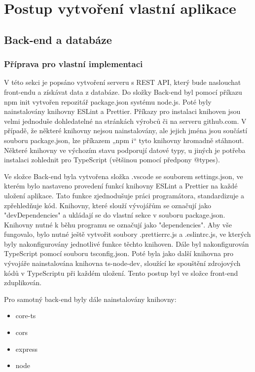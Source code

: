 \chapter{Postup vytvoření vlastní aplikace}

\section{Back-end a databáze}
\subsection{Příprava pro vlastní implementaci}
V této sekci je popsáno vytvoření serveru s REST API, který bude naslouchat front-endu a získávat data z databáze. Do složky Back-end byl pomocí příkazu npm init vytvořen repozitář package.json systému node.js. Poté byly nainstalovány knihovny ESLint a Prettier. Příkazy pro instalaci knihoven jsou velmi jednoduše dohledatelné na stránkách výrobců či na serveru github.com. V případě, že některé knihovny nejsou nainstalovány, ale jejich jména jsou součástí souboru package.json, lze příkazem „npm i“ tyto knihovny hromadně stáhnout. Některé knihovny ve výchozím stavu podporují datové typy, u jiných je potřeba instalaci zohlednit pro TypeScript (většinou pomocí předpony @types).

 Ve složce Back-end byla vytvořena složka .vscode se souborem settings.json, ve kterém bylo nastaveno provedení funkcí knihovny ESLint a Prettier na každé uložení aplikace. Tato funkce zjednodušuje práci programátora, standardizuje a zpřehledňuje kód. Knihovny, které slouží vývojářům se označují jako "devDependencies" a ukládají se do vlastní sekce v souboru package.json. Knihovny nutné k běhu programu se označují jako "dependencies". Aby vše fungovalo, bylo nutné ještě vytvořit soubory .prettierrc.js a .eslintrc.js, ve kterých byly nakonfigurovány jednotlivé funkce těchto knihoven. Dále byl nakonfigurován TypeScript pomocí souboru tsconfig.json. Poté byla jako další knihovna pro vývojáře nainstalována knihovna ts-node-dev, sloužící ke spouštění zdrojových kódů v TypeScriptu při každém uložení. Tento postup byl ve složce front-end zduplikován.

Pro samotný back-end byly dále nainstalovány knihovny:
\begin{itemize}
\item core-ts
\item cors
\item express
\item node
\end{itemize}



